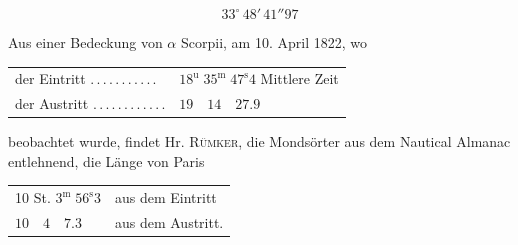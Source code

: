 \[
33^{\circ}\,48'\,41''97
\]

Aus einer Bedeckung von $\alpha$ Scorpii, am 10. April 1822, wo

% 
\begin{center}
\small
\begin{tabular}{l l}
der Eintritt \mbox{.\,.\,.\,.\,.\,.\,.\,.\,.\,.\,.} & $18^{\mathrm{u}}\;35^{\mathrm{m}}\;47^{\mathrm{s}}4$ Mittlere Zeit \\
der Austritt \mbox{.\,.\,.\,.\,.\,.\,.\,.\,.\,.\,.\,.} & $19\quad14\quad27.9$
\end{tabular}
\end{center}

\noindent beobachtet wurde, findet Hr. \textsc{Rümker}, die Mondsörter aus dem Nautical Almanac entlehnend, die Länge von Paris
\begin{center}
\begin{tabular}{l l}
10 St. $3^{\mathrm{m}}\;56^{\mathrm{s}}3$ & aus dem Eintritt \\
$10\quad4\quad7.3$ & aus dem Austritt.
\end{tabular}
\end{center}
